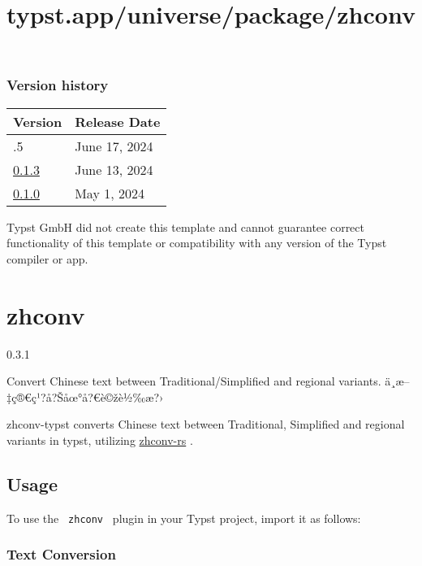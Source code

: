 \label{versions}
\subsubsection{Version history}\label{version-history}

\begin{longtable}[]{@{}ll@{}}
\toprule\noalign{}
Version & Release Date \\
\midrule\noalign{}
\endhead
\bottomrule\noalign{}
\endlastfoot
0.1.5 & June 17, 2024 \\
\href{https://typst.app/universe/package/isc-hei-report/0.1.3/}{0.1.3} &
June 13, 2024 \\
\href{https://typst.app/universe/package/isc-hei-report/0.1.0/}{0.1.0} &
May 1, 2024 \\
\end{longtable}

Typst GmbH did not create this template and cannot guarantee correct
functionality of this template or compatibility with any version of the
Typst compiler or app.


\title{typst.app/universe/package/zhconv}

\label{banner}
\section{zhconv}\label{zhconv}

{ 0.3.1 }

Convert Chinese text between Traditional/Simplified and regional
variants. ä¸­æ--‡ç®€ç¹?å?Šåœ°å?€è©žè½‰æ?›

\label{readme}
zhconv-typst converts Chinese text between Traditional, Simplified and
regional variants in typst, utilizing
\href{https://github.com/Gowee/zhconv-rs}{zhconv-rs} .

\subsection{Usage}\label{usage}

To use the \texttt{\ zhconv\ } plugin in your Typst project, import it
as follows:

\begin{Shaded}
\begin{Highlighting}[]
\end{Highlighting}
\end{Shaded}

\subsubsection{Text Conversion}\label{text-conversion}

